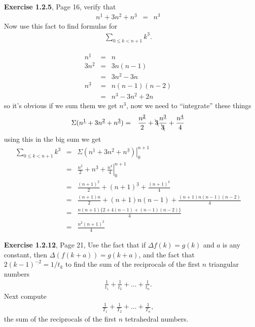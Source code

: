 \documentclass[aps,preprint,preprintnumbers,nofootinbib,showpacs,prd]{revtex4-1}
\newcommand{\nbea}{\begin{eqnarray*}}
\newcommand{\neea}{\end{eqnarray*}}
\begin{document}
{\bf Exercise 1.2.5}, Page 16, verify that
%
\nbea
n^{\underline 1} + 3n^{\underline 2} + n^{\underline 3} & = & n^3
\neea
%
Now use this fact to find formulas for
%
\nbea
\sum_{0\le k <n+1} k^3.
\neea
%

%
\nbea
n^{\underline 1} & = & n\\
3n^{\underline 2} & = & 3n(n-1) \\
& = & 3n^2 - 3n \\
n^{\underline 3} & = & n(n-1)(n-2) \\
& = & n^3 - 3n^2 + 2n
\neea
%
so it's obvious if we sum them we get $n^3$, now we need to ``integrate'' these things
%
\nbea
\Sigma (n^{\underline 1} + 3n^{\underline 2} + n^{\underline 3}) & = & \frac{n^{\underline 2}}{2} + \bcancel{3}\frac{n^{\underline 3}}{\bcancel{3}} + \frac{n^{\underline 4}}{4}
\neea
%
using this in the big sum we get
%
\nbea
\sum_{0\le k <n+1} k^3 & = & \left.\Sigma(n^{\underline 1} + 3n^{\underline 2} + n^{\underline 3})\right|_0^{n+1} \\
& = & \left.\frac{n^{\underline 2}}{2} + n^{\underline 3} + \frac{n^{\underline 4}}{4}\right|_0^{n+1} \\
& = & \frac{(n+1)^{\underline 2}}{2} + (n+1)^{\underline 3} + \frac{(n+1)^{\underline 4}}{4} \\
& = & \frac{(n+1)n}{2} + (n+1)n(n-1) + \frac{(n+1)n(n-1)(n-2)}{4} \\
& = & \frac{n(n+1)\{2 + 4(n-1) + (n-1)(n-2)\}}{4} \\
& = & \frac{n^2(n+1)^2}{4}
\neea
%

{\bf Exercise 1.2.12}, Page 21, Use the fact that if $\Delta f(k) = g(k)$ and $a$ is any constant, then $\Delta (f(k+a)) = g(k+a)$, and the fact that $2(k-1)^{\underline {-2}} = 1/t_k$ to find the sum of the reciprocals of the first $n$ triangular numbers
%
\nbea
\frac{1}{t_1} + \frac{1}{t_2} + \ldots + \frac{1}{t_n}.
\neea
%
Next compute
%
\nbea
\frac{1}{T_1} + \frac{1}{T_2} + \ldots + \frac{1}{T_n},
\neea
%
the sum of the reciprocals of the first $n$ tetrahedral numbers.
\end{document}
